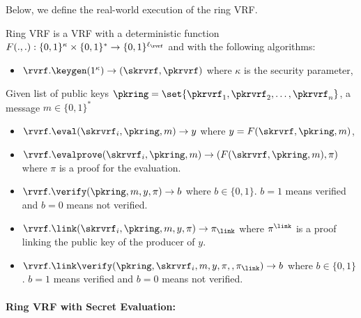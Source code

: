 Below, we define the real-world execution of the ring VRF.
\begin{definition}\label{def:ringvrf}
	Ring VRF is a VRF with a deterministic function $ F(.,.):\{0,1\}^\kappa \times\{0,1\}^* \rightarrow \{0,1\}^{\ell_\rvrf} $ and with the following algorithms:
	
	\begin{itemize}
		\item $ \rvrf.\keygen(1^\kappa) \rightarrow (\skrvrf,\pkrvrf)$ where $ \kappa $ is the security parameter,
	\end{itemize}
	Given list of public keys $ \pkring = \set{\pkrvrf_1, \pkrvrf_2, \ldots, \pkrvrf_n}$, a message $ m \in \{0,1\}^* $
	\begin{itemize}
		\item $ \rvrf.\eval(\skrvrf_i, \pkring, m)\rightarrow y $ where $ y = F(\skrvrf,\pkring,m) $,
		\item $ \rvrf.\evalprove(\skrvrf_i, \pkring, m)\rightarrow (F(\skrvrf,\pkring,m),\pi) $ where  $ \pi $ is a proof for the evaluation.
		\item $ \rvrf.\verify(\pkring, m, y,\pi) \rightarrow  b$ where $ b \in \{0,1\} $. $ b =1 $ means verified and $ b = 0 $ means not verified.
		\item $ \rvrf.\link(\skrvrf_i, \pkring,m,y, \pi) \rightarrow \pi_{\link} $ where  $ \pi^\link $ is a proof linking the public key of the producer of $ y $. 
		\item $ \rvrf.\link\verify(\pkring, \skrvrf_i, m, y, \pi,, \pi_{\link})\rightarrow b$ where $ b \in \{0,1\} $. $ b =1 $ means verified and $ b = 0 $ means not verified.
	\end{itemize}
	
\end{definition}
\paragraph{Ring VRF with Secret Evaluation:} 


